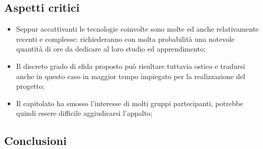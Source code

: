 \subsection{Aspetti critici}
\begin{itemize}
\item Seppur accattivanti le tecnologie coinvolte sono molte ed anche relativamente recenti e complesse: richiederanno con molta probabilità una notevole quantità di ore da dedicare al loro studio ed apprendimento;
\item Il discreto grado di sfida proposto può risultare tuttavia ostico e tradursi anche in questo caso in maggior tempo impiegato per la realizzazione del progetto;
\item Il capitolato ha smosso l'interesse di molti gruppi partecipanti, potrebbe quindi essere difficile aggiudicarsi l'appalto;
\end{itemize}

\subsection{Conclusioni}

